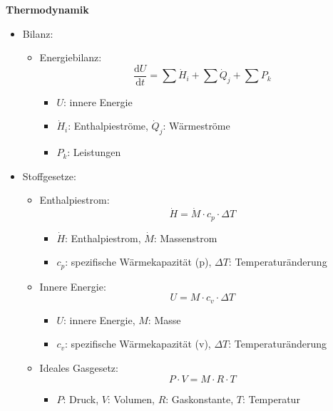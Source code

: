\documentclass[12pt]{article}
\begin{document}
\textbf{Thermodynamik}
\begin{itemize}
    \item Bilanz:
    \begin{itemize}
        \item Energiebilanz:
        \[
        \frac{\mathrm{d}U}{\mathrm{d}t}=\sum \dot{H}_i+\sum \dot{Q}_j+\sum P_k
        \]
        \begin{itemize}
            \item \(U\): innere Energie
            \item \(\dot{H}_i\): Enthalpieströme, \(\dot{Q}_j\): Wärmeströme
            \item \(P_k\): Leistungen
        \end{itemize}
    \end{itemize}
    \item Stoffgesetze:
    \begin{itemize}
        \item Enthalpiestrom:
        \[
        \dot{H}=\dot{M}\cdot c_p\cdot \Delta T
        \]
        \begin{itemize}
            \item \(\dot{H}\): Enthalpiestrom, \(\dot{M}\): Massenstrom
            \item \(c_p\): spezifische Wärmekapazität (p), \(\Delta T\): Temperaturänderung
        \end{itemize}
        \item Innere Energie:
        \[
        U=M\cdot c_v\cdot \Delta T
        \]
        \begin{itemize}
            \item \(U\): innere Energie, \(M\): Masse
            \item \(c_v\): spezifische Wärmekapazität (v), \(\Delta T\): Temperaturänderung
        \end{itemize}
        \item Ideales Gasgesetz:
        \[
        P\cdot V=M\cdot R\cdot T
        \]
        \begin{itemize}
            \item \(P\): Druck, \(V\): Volumen, \(R\): Gaskonstante, \(T\): Temperatur
        \end{itemize}
    \end{itemize}
\end{itemize}
\end{document}
